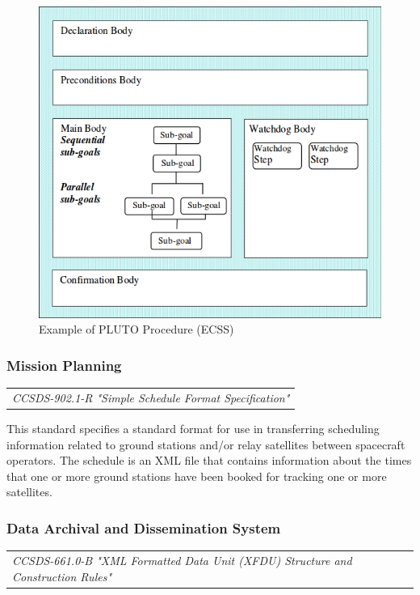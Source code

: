  \begin{figure}[h]
\centering\includegraphics[scale=0.45]{fig/example_of_pluto_procedure}
\caption{Example of PLUTO Procedure (ECSS)}
\label{fig:Example of PLUTO Procedure}
\end{figure}

\subsubsection{Mission Planning}

\begin{tabular}{l}
\textit{CCSDS-902.1-R "Simple Schedule Format Specification" \cite{CCSDS-902.1-R}} \\
\end{tabular}

This standard specifies a standard format for use in transferring scheduling information related to ground stations and/or relay satellites between spacecraft operators. The schedule is an XML file that contains information about the times that one or more ground stations have been booked for tracking one or more satellites.

\subsubsection{Data Archival and Dissemination System}

\begin{tabular}{l}
\textit{CCSDS-661.0-B "XML Formatted Data Unit (XFDU) Structure and Construction Rules" \cite{CCSDS-661.0-B}} \\
\end{tabular}

